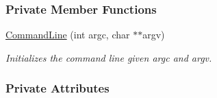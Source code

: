\subsubsection*{Private Member Functions}
\begin{DoxyCompactItemize}
\item 
\hyperlink{structslb_1_1core_1_1commandLine_1_1CommandLine_a483a8ee633d26d4e6423387d5f81daf7}{Command\+Line} (int argc, char $\ast$$\ast$argv)
\begin{DoxyCompactList}\small\item\em Initializes the command line given {\ttfamily argc} and {\ttfamily argv}. \end{DoxyCompactList}\end{DoxyCompactItemize}
\subsubsection*{Private Attributes}
